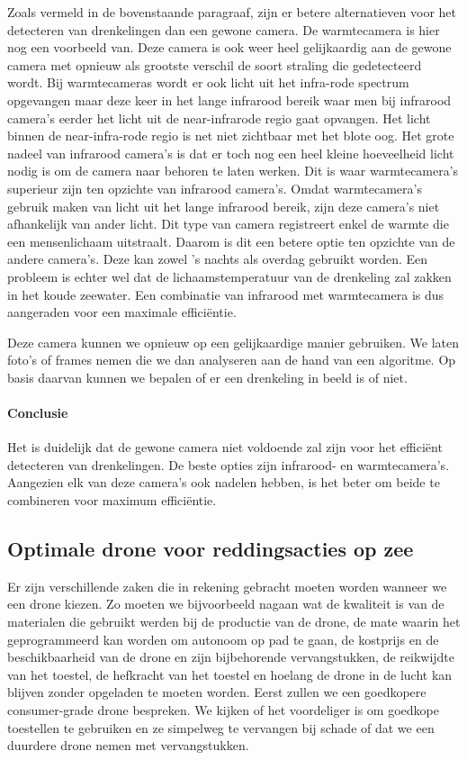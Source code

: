 Zoals vermeld in de bovenstaande paragraaf, zijn er betere alternatieven voor het detecteren van drenkelingen dan een gewone camera. De warmtecamera is hier nog een voorbeeld van. Deze camera is ook weer heel gelijkaardig aan de gewone camera met opnieuw als grootste verschil de soort straling die gedetecteerd wordt. Bij warmtecameras wordt er ook licht uit het infra-rode spectrum opgevangen maar deze keer in het lange infrarood bereik waar men bij infrarood camera's eerder het licht uit de near-infrarode regio gaat opvangen. Het licht binnen de near-infra-rode regio is net niet zichtbaar met het blote oog. Het grote nadeel van infrarood camera's is dat er toch nog een heel kleine hoeveelheid licht nodig is om de camera naar behoren te laten werken. Dit is waar warmtecamera's superieur zijn ten opzichte van infrarood camera's. Omdat warmtecamera's gebruik maken van licht uit het lange infrarood bereik, zijn deze camera's niet afhankelijk van ander licht. Dit type van camera registreert enkel de warmte die een mensenlichaam uitstraalt. Daarom is dit een betere optie ten opzichte van de andere camera's. Deze kan zowel 's nachts als overdag gebruikt worden. Een probleem is echter wel dat de lichaamstemperatuur van de drenkeling zal zakken in het koude zeewater. Een combinatie van infrarood met warmtecamera is dus aangeraden voor een maximale efficiëntie.

Deze camera kunnen we opnieuw op een gelijkaardige manier gebruiken. We laten foto's of frames nemen die we dan analyseren aan de hand van een algoritme. Op basis daarvan kunnen we bepalen of er een drenkeling in beeld is of niet. 

\paragraph{Conclusie}
Het is duidelijk dat de gewone camera niet voldoende zal zijn voor het efficiënt detecteren van drenkelingen. De beste opties zijn infrarood- en warmtecamera's. Aangezien elk van deze camera's ook nadelen hebben, is het beter om beide te combineren voor maximum efficiëntie.

\subsection{Optimale drone voor reddingsacties op zee}

Er zijn verschillende zaken die in rekening gebracht moeten worden wanneer we een drone kiezen. Zo moeten we bijvoorbeeld nagaan wat de kwaliteit is van de materialen die gebruikt werden bij de productie van de drone, de mate waarin het geprogrammeerd kan worden om autonoom op pad te gaan, de kostprijs en de beschikbaarheid van de drone en zijn bijbehorende vervangstukken, de reikwijdte van het toestel, de hefkracht van het toestel en hoelang de drone in de lucht kan blijven zonder opgeladen te moeten worden. Eerst zullen we een goedkopere consumer-grade drone bespreken. We kijken of het voordeliger is om goedkope toestellen te gebruiken en ze simpelweg te vervangen bij schade of dat we een duurdere drone nemen met vervangstukken.


